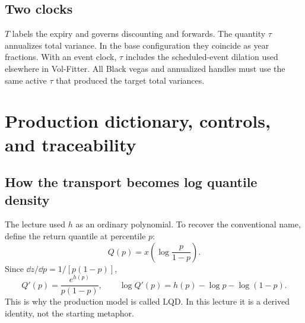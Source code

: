 \documentclass[11pt]{article}
\begin{document}
\subsection{Two clocks}

$T$ labels the expiry and governs discounting and forwards.  The quantity
$\tau$ annualizes total variance.  In the base configuration they coincide as
year fractions.  With an event clock, $\tau$ includes the scheduled-event
dilation used elsewhere in Vol-Fitter.  All Black vegas and annualized handles
must use the same active $\tau$ that produced the target total variances.

\section{Production dictionary, controls, and traceability}
\label{app:dictionary}

\subsection{How the transport becomes log quantile density}

The lecture used $h$ as an ordinary polynomial.  To recover the conventional
name, define the return quantile at percentile $p$:
\begin{equation}
Q(p)=x\!\left(\log\frac{p}{1-p}\right).
\label{eq:legacy_quantile}
\end{equation}
Since $\dd z/\dd p=1/[p(1-p)]$,
\begin{equation}
Q'(p)=\frac{e^{h(p)}}{p(1-p)},\qquad
\log Q'(p)=h(p)-\log p-\log(1-p).
\label{eq:lqd_revealed}
\end{equation}
This is why the production model is called LQD.  In this lecture it is a
derived identity, not the starting metaphor.
\end{document}
